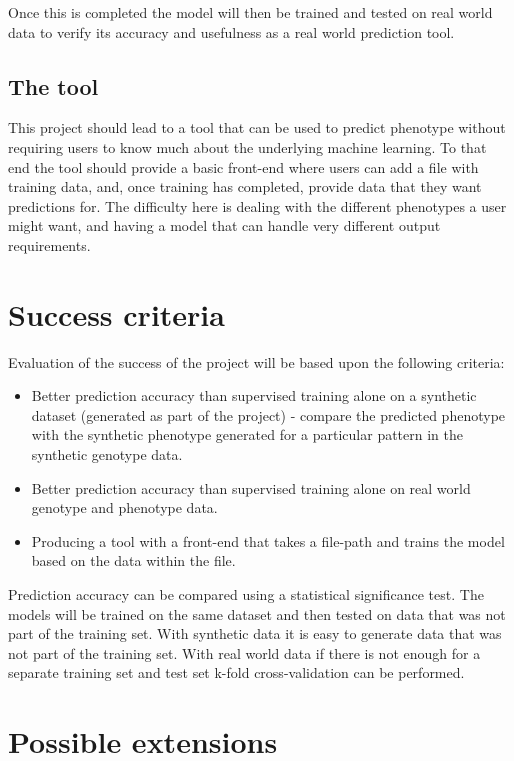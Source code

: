 \documentclass[12pt,a4paper,twoside,openany]{article}
\begin{document}
Once this is completed the model will then be trained and tested on real world data to verify its accuracy and usefulness as a real world prediction tool.

\subsection*{The tool}

This project should lead to a tool that can be used to predict phenotype without requiring users to know much about the underlying machine learning. To that end the tool should provide a basic front-end where users can add a file with training data, and, once training has completed, provide data that they want predictions for. The difficulty here is dealing with the different phenotypes a user might want, and having a model that can handle very different output requirements.

\section*{Success criteria}

Evaluation of the success of the project will be based upon the following criteria:

\begin{itemize}
    \item Better prediction accuracy than supervised training alone on a synthetic dataset (generated as part of the project) - compare the predicted phenotype with the synthetic phenotype generated for a particular pattern in the synthetic genotype data.
    \item Better prediction accuracy than supervised training alone on real world genotype and phenotype data.
    \item Producing a tool with a front-end that takes a file-path and trains the model based on the data within the file.
\end{itemize}

Prediction accuracy can be compared using a statistical significance test. The models will be trained on the same dataset and then tested on data that was not part of the training set. With synthetic data it is easy to generate data that was not part of the training set. With real world data if there is not enough for a separate training set and test set k-fold cross-validation can be performed.

\section*{Possible extensions}
\end{document}
